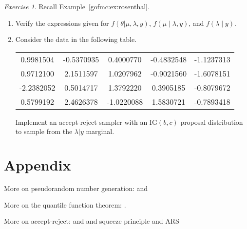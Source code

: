 \documentclass[12pt]{article}
\theoremstyle{plain}
\theoremstyle{definition}
\theoremstyle{remark}
\newtheorem{hw}{Exercise}[section]
\begin{document}
\begin{hw} \label{gofmc:hw:rosenthal}
Recall Example~\ref{gofmc:ex:rosenthal}.  
\begin{enumerate}
\item Verify the expressions given for $f(\theta| \mu, \lambda, y)$,
  $f(\mu \mid \lambda, y)$, and  
$f(\lambda \mid y)$. 
\item Consider the data in the following table.
\begin{table}
\begin{center}
\begin{tabular}{ccccc} 
  \hline
0.9981504 & -0.5370935 & 0.4000770 & -0.4832548 & -1.1237313 \\
0.9712100 & 2.1511597 & 1.0207962 & -0.9021560 & -1.6078151 \\
-2.2382052 & 0.5014717 & 1.3792220 & 0.3905185 & -0.8079672 \\
0.5799192 & 2.4626378 & -1.0220088 & 1.5830721 & -0.7893418 \\
  \hline
\end{tabular}
\end{center}
\end{table} 
Implement an accept-reject sampler with an $\text{IG}(b,c)$ proposal
distribution to sample from the $\lambda |y$ marginal.
\end{enumerate}
\end{hw}


\newpage

\section*{Appendix}

More on pseudorandom number generation: \citet{devr:1986} and \citet{fish:1996}

More on the quantile function theorem: \citet{angu:1994}.
 
More on accept-reject:  \citet{caff:boot:davi:2001} and \citet{mart:luen:migu:2012} and squeeze principle and ARS



\end{document}
